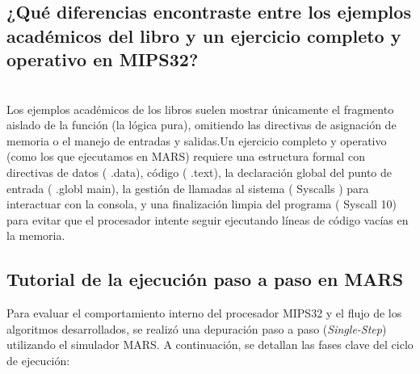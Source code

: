 \documentclass[12pt, a4paper]{article}
\begin{document}
\subsection{¿Qué diferencias encontraste entre los ejemplos académicos del libro y un ejercicio completo y operativo en MIPS32?}\\
    Los ejemplos académicos de los libros suelen mostrar únicamente el fragmento aislado de la función (la lógica pura), omitiendo las directivas de asignación de memoria o el manejo de entradas y salidas.Un ejercicio completo y operativo (como los que ejecutamos en MARS) requiere una estructura formal con directivas de datos ( .data), código ( .text), la declaración global del punto de entrada ( .globl main), la gestión de llamadas al sistema ( Syscalls ) para interactuar con la consola, y una finalización limpia del programa ( Syscall 10) para evitar que el procesador intente seguir ejecutando líneas de código vacías en la memoria.

\subsection{Tutorial de la ejecución paso a paso en MARS}
    Para evaluar el comportamiento interno del procesador MIPS32 y el flujo de los algoritmos desarrollados, se realizó una depuración paso a paso (\textit{Single-Step}) utilizando el simulador MARS. A continuación, se detallan las fases clave del ciclo de ejecución:
    
\end{document}
